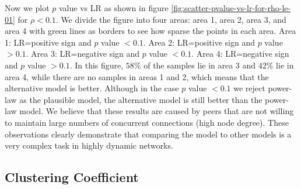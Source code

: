 \documentclass[paper]{ieice}
\begin{document}
Now we plot $p$ value vs LR as shown in figure \ref{fig:scatter-pvalue-vs-lr-for-rho-le-01} for $\rho < 0.1$.
We divide the figure into four areas: area 1, area 2, area 3, and area 4  with green lines as borders to see how sparse the points in each area.
Area 1: LR=positive sign and $p$ value $<0.1$.
Area 2: LR=positive sign and $p$ value $>0.1$.
Area 3: LR=negative sign and $p$ value $<0.1$.
Area 4: LR=negative sign and $p$ value $>0.1$. 
In this figure, $58\%$ of the samples lie in area 3 and  $42\%$ lie in area 4, while there are no samples in areas 1 and 2, which means that the alternative model is better.
Although in the case $p$ value $<0.1$ we reject power-law as the plausible model, the alternative model is still better than the power-law model. 
We believe that these results are caused by peers that are not willing to maintain large numbers of concurrent connections (high node degree).
These observations clearly demonstrate that comparing the model to other models is a very complex task in highly dynamic networks.

\subsection{Clustering Coefficient}\label{clusteringcoef}
\end{document}
